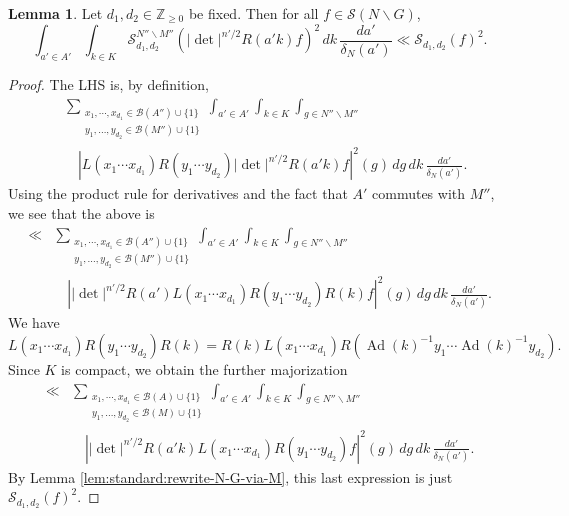 \documentclass[reqno]{amsart}
\DeclareMathOperator{\Ad}{Ad}
\theoremstyle{plain} \newtheorem{theorem} {Theorem}
\theoremstyle{definition} \newtheorem{definition} [theorem] {Definition}
\theoremstyle{itplain} %
\newtheorem{lemma}[theorem]{Lemma}
\numberwithin{equation}{section}
\numberwithin{theorem}{section}
\renewcommand{\geq}{\geqslant}
\begin{document}
\begin{lemma}\label{lem:induct-sobolev-norms}
  Let $d_1, d_2 \in \mathbb{Z}_{\geq 0}$ be fixed.  Then for all $f \in \mathcal{S}(N \backslash G)$,
  \begin{equation*}
    \int _{a' \in A'}
    \int _{k \in K}
    \mathcal{S} _{d_1, d_2} ^{N'' \backslash M''}
    \left(
      |\det|^{n'/2}
      R(a' k) f
    \right)^2
    \, d k
    \, \frac{d a '}{\delta_N(a')}
    \ll
    \mathcal{S}_{d_1,d_2}(f)^2.
  \end{equation*}
\end{lemma}
\begin{proof}
  The LHS is, by definition,
  \begin{align*}
    &\sum _{
    \substack{
      x_1, \dotsb, x_{d_1} \in \mathcal{B}(A'') \cup \{1\}  \\
       y_1, \dotsc, y _{d _2 } \in \mathcal{B}(M'') \cup \{1\}
    }
  }
  \int _{a' \in A'}
  \int _{k \in K}
  \int _{g \in N'' \backslash M''} \\
    &\quad \left\lvert    L(x_1 \dotsb x_{d_1}) R(y_1 \dotsb y_{d_2}) |\det|^{n'/2} R(a' k) f 
  \right\rvert^2(g)
  \, d g
      \, d k
      \, \frac{d a '}{\delta_N(a')}.
  \end{align*}
  Using the product rule for derivatives and the fact that $A'$ commutes with $M''$, we see that the above is
  \begin{align*}
    \ll &\sum _{
    \substack{
      x_1, \dotsb, x_{d_1} \in \mathcal{B}(A'') \cup \{1\}  \\
       y_1, \dotsc, y _{d _2 } \in \mathcal{B}(M'') \cup \{1\}
    }
  }
  \int _{a' \in A'}
  \int _{k \in K}
  \int _{g \in N'' \backslash M''} \\
    &\quad \left\lvert  |\det|^{n'/2} R(a')   L(x_1 \dotsb x_{d_1}) R(y_1 \dotsb y_{d_2}) R(k) f 
  \right\rvert^2(g)
  \, d g
       \, d k \, \frac{d a '}{\delta_N(a')}.
  \end{align*}
  We have
  \begin{equation*}
    L(x_1 \dotsb x_{d_1}) R(y_1 \dotsb y_{d_2}) R(k)
    =
    R(k) L(x_1 \dotsb x_{d_1}) R(\Ad(k)^{-1} y_1 \dotsb \Ad(k)^{-1} y_{d_2}).
  \end{equation*}
  Since $K$ is compact, we obtain the further majorization
  \begin{align*}
    \ll &\sum _{
    \substack{
      x_1, \dotsb, x_{d_1} \in \mathcal{B}(A) \cup \{1\}  \\
       y_1, \dotsc, y _{d _2 } \in \mathcal{B}(M) \cup \{1\}
    }
  }
  \int _{a' \in A'}
  \int _{k \in K}
  \int _{g \in N'' \backslash M''} \\
    &\quad \left\lvert  |\det|^{n'/2} R(a' k)   L(x_1 \dotsb x_{d_1}) R(y_1 \dotsb y_{d_2}) f 
  \right\rvert^2(g)
      \, d g
       \, d k
    \, \frac{d a '}{\delta_N(a')}.
  \end{align*}
  By Lemma \ref{lem:standard:rewrite-N-G-via-M}, this last expression is just $\mathcal{S}_{d_1,d_2}(f)^2$.
\end{proof}
\end{document}
